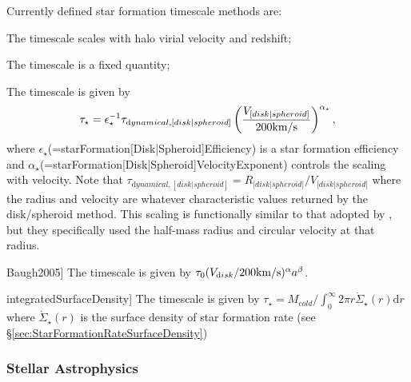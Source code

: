Currently defined star formation timescale methods are:
\begin{description}
 \item [\hyperlink{star_formation.timescales.disks.halo_scaling.F90:star_formation_timescale_disks_halo_scaling}{{\normalfont \ttfamily haloScaling}}]  The timescale scales with halo virial velocity and redshift;
 \item [\hyperlink{star_formation.timescales.disks.fixed.F90:star_formation_timescale_disks_fixed}{{\normalfont \ttfamily fixed}}]  The timescale is a fixed quantity;
 \item [\hyperlink{star_formation.timescales.disks.dynamical_time.F90:star_formation_timescale_disks_dynamical_time:star_formation_timescale_disk_dynamical_time}{{\normalfont \ttfamily dynamicalTime}}]  The timescale is given by
\begin{equation}
 \tau_\star = \epsilon_\star^{-1} \tau_{\mathrm dynamical, [disk|spheroid]} \left( {V_{\mathrm [disk|spheroid]} \over 200\hbox{km/s}} \right)^{\alpha_\star},
\end{equation}
where $\epsilon_\star$(={\normalfont \ttfamily starFormation[Disk|Spheroid]Efficiency}) is a star formation efficiency and $\alpha_\star$(={\normalfont \ttfamily starFormation[Disk|Spheroid]VelocityExponent}) controls the scaling with velocity. Note that $\tau_{\mathrm dynamical,[disk|spheroid]}=R_{\mathrm [disk|spheroid]}/V_{\mathrm [disk|spheroid]}$ where the radius and velocity are whatever characteristic values returned by the disk/spheroid method. This scaling is functionally similar to that adopted by \cite{cole_hierarchical_2000}, but they specifically used the half-mass radius and circular velocity at that radius.
 \item {\normalfont \ttfamily Baugh2005}] The timescale is given by $\tau_0 (V_{\mathrm disk}/200\hbox{km/s})^\alpha a^\beta$.
 \item {\normalfont \ttfamily integratedSurfaceDensity}] The timescale is given by $\tau_\star = M_{\mathrm cold}/\int_0^\infty 2 \pi r \dot{\Sigma}_\star(r) {\mathrm d}r$ where $\dot{\Sigma}_\star(r)$ is the surface density of star formation rate (see \S\ref{sec:StarFormationRateSurfaceDensity})
\end{description}

\subsubsection{Stellar Astrophysics}

